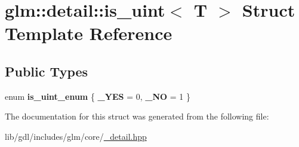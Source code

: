 \hypertarget{structglm_1_1detail_1_1is__uint}{}\section{glm\+:\+:detail\+:\+:is\+\_\+uint$<$ T $>$ Struct Template Reference}
\label{structglm_1_1detail_1_1is__uint}
\subsection*{Public Types}
\begin{DoxyCompactItemize}
\item 
\hypertarget{structglm_1_1detail_1_1is__uint_af582e63446f155a40eacc7da2016a277}{}enum {\bfseries is\+\_\+uint\+\_\+enum} \{ {\bfseries \+\_\+\+Y\+E\+S} = 0, 
{\bfseries \+\_\+\+N\+O} = 1
 \}\label{structglm_1_1detail_1_1is__uint_af582e63446f155a40eacc7da2016a277}

\end{DoxyCompactItemize}


The documentation for this struct was generated from the following file\+:\begin{DoxyCompactItemize}
\item 
lib/gdl/includes/glm/core/\hyperlink{__detail_8hpp}{\+\_\+detail.\+hpp}\end{DoxyCompactItemize}
